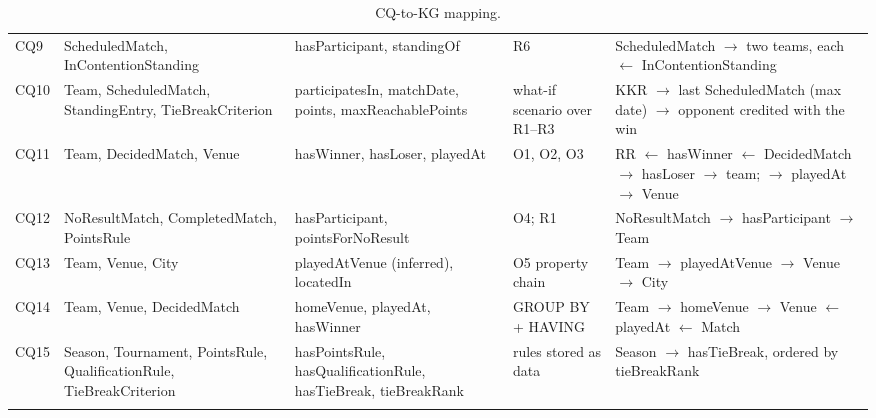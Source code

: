 {\begin{longtable}{p{0.8cm}p{3.3cm}p{3.4cm}p{2.4cm}p{4.4cm}}
CQ9 & ScheduledMatch, InContentionStanding & hasParticipant, standingOf & R6 & ScheduledMatch $\rightarrow$ two teams, each $\leftarrow$ InContentionStanding \\
CQ10 & Team, ScheduledMatch, StandingEntry, TieBreakCriterion & participatesIn, matchDate, points, maxReachablePoints & what-if scenario over R1--R3 & KKR $\rightarrow$ last ScheduledMatch (max date) $\rightarrow$ opponent credited with the win \\
CQ11 & Team, DecidedMatch, Venue & hasWinner, hasLoser, playedAt & O1, O2, O3 & RR $\leftarrow$ hasWinner $\leftarrow$ DecidedMatch $\rightarrow$ hasLoser $\rightarrow$ team; $\rightarrow$ playedAt $\rightarrow$ Venue \\
CQ12 & NoResultMatch, CompletedMatch, PointsRule & hasParticipant, pointsForNoResult & O4; R1 & NoResultMatch $\rightarrow$ hasParticipant $\rightarrow$ Team \\
CQ13 & Team, Venue, City & playedAtVenue (inferred), locatedIn & O5 property chain & Team $\rightarrow$ playedAtVenue $\rightarrow$ Venue $\rightarrow$ City \\
CQ14 & Team, Venue, DecidedMatch & homeVenue, playedAt, hasWinner & GROUP BY + HAVING & Team $\rightarrow$ homeVenue $\rightarrow$ Venue $\leftarrow$ playedAt $\leftarrow$ Match \\
CQ15 & Season, Tournament, PointsRule, QualificationRule, TieBreakCriterion & hasPointsRule, hasQualificationRule, hasTieBreak, tieBreakRank & rules stored as data & Season $\rightarrow$ hasTieBreak, ordered by tieBreakRank \\
\bottomrule
\caption{CQ-to-KG mapping.}\label{tab:mapping}
\end{longtable}}
